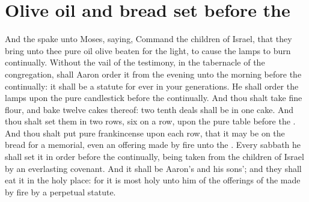 \section*{Olive oil and bread set before the \LORD}
\begin{biblechapter} %
\verse And the \LORD spake unto Moses, saying,
\verse Command the children of Israel, that they bring unto thee pure oil olive beaten for the light, to cause the lamps to burn continually.
\verse Without the vail of the testimony, in the tabernacle of the congregation, shall Aaron order it from the evening unto the morning before the \LORD continually: it shall be a statute for ever in your generations.
\verse He shall order the lamps upon the pure candlestick before the \LORD continually.
\verse And thou shalt take fine flour, and bake twelve cakes thereof: two tenth deals shall be in one cake.
\verse And thou shalt set them in two rows, six on a row, upon the pure table before the \LORD.
\verse And thou shalt put pure frankincense upon each row, that it may be on the bread for a memorial, even an offering made by fire unto the \LORD.
\verse Every sabbath he shall set it in order before the \LORD continually, being taken from the children of Israel by an everlasting covenant.
\verse And it shall be Aaron's and his sons'; and they shall eat it in the holy place: for it is most holy unto him of the offerings of the \LORD made by fire by a perpetual statute.

\end{biblechapter}

